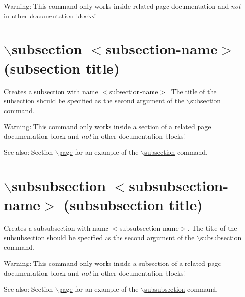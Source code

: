 \begin{Desc}
\item[Warning:]This command only works inside related page documentation and {\em not\/} in other documentation blocks!\end{Desc}


 \hypertarget{commands_cmdsubsection}{}\section{$\backslash$subsection $<$subsection-name$>$ (subsection title)}\label{commands_cmdsubsection}
 Creates a subsection with name $<$subsection-name$>$. The title of the subsection should be specified as the second argument of the $\backslash$subsection command.

\begin{Desc}
\item[Warning:]This command only works inside a section of a related page documentation block and {\em not\/} in other documentation blocks!\end{Desc}
\begin{Desc}
\item[See also:]Section \hyperlink{commands_cmdpage}{$\backslash$page} for an example of the \hyperlink{commands_cmdsubsection}{$\backslash$subsection} command.\end{Desc}


 \hypertarget{commands_cmdsubsubsection}{}\section{$\backslash$subsubsection $<$subsubsection-name$>$ (subsubsection title)}\label{commands_cmdsubsubsection}
 Creates a subsubsection with name $<$subsubsection-name$>$. The title of the subsubsection should be specified as the second argument of the $\backslash$subsubsection command.

\begin{Desc}
\item[Warning:]This command only works inside a subsection of a related page documentation block and {\em not\/} in other documentation blocks!\end{Desc}
\begin{Desc}
\item[See also:]Section \hyperlink{commands_cmdpage}{$\backslash$page} for an example of the \hyperlink{commands_cmdsubsubsection}{$\backslash$subsubsection} command.\end{Desc}


